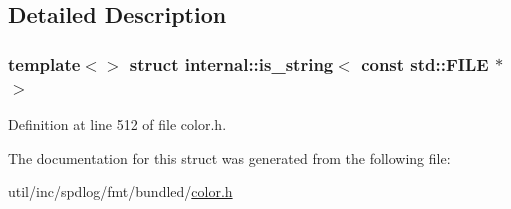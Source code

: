 \subsection{Detailed Description}
\subsubsection*{template$<$$>$\newline
struct internal\+::is\+\_\+string$<$ const std\+::\+F\+I\+L\+E $\ast$ $>$}



Definition at line 512 of file color.\+h.



The documentation for this struct was generated from the following file\+:\begin{DoxyCompactItemize}
\item 
util/inc/spdlog/fmt/bundled/\hyperlink{color_8h}{color.\+h}\end{DoxyCompactItemize}
